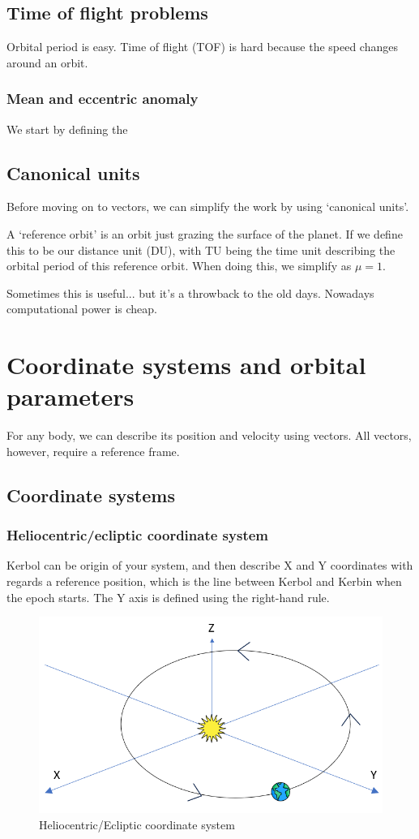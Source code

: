 \documentclass{report}
\begin{document}
\section{Time of flight problems}

Orbital period is easy. Time of flight (TOF) is hard because the speed changes around an orbit.

\subsection{Mean and eccentric anomaly}
We start by defining the 



\section{Canonical units}
Before moving on to vectors, we can simplify the work by using `canonical units'.

A `reference orbit' is an orbit just grazing the surface of the planet. If we define this to be our distance unit (DU), with TU being the time unit describing the orbital period of this reference orbit. When doing this, we simplify as $\mu = 1$. 

Sometimes this is useful... but it's a throwback to the old days. Nowadays computational power is cheap.

\chapter{Coordinate systems and orbital parameters}
For any body, we can describe its position and velocity using vectors. All vectors, however, require a reference frame.

\section{Coordinate systems}
\subsection{Heliocentric/ecliptic coordinate system}
Kerbol can be origin of your system, and then describe X and Y coordinates with regards a reference position, which is the line between Kerbol and Kerbin when the epoch starts. The Y axis is defined using the right-hand rule. 

\begin{figure}[H]
    \centering
    \includegraphics[width=0.5\linewidth]{Latex Images/Heliocentric.png}
    \caption{Heliocentric/Ecliptic coordinate system}
    \label{fig:enter-label}
\end{figure}
\end{document}
